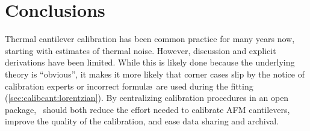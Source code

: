 \section{Conclusions}
\label{sec:calibcant:conclusions}

Thermal cantilever calibration has been common practice for many years
now\citep{hutter93,florin95}, starting with estimates of thermal
noise\citep{martin87}.  However, discussion and explicit derivations
have been limited.  While this is likely done because the underlying
theory is ``obvious'', it makes it more likely that corner cases slip
by the notice of calibration experts\citep{hutter93-erratum} or
incorrect formul\ae\ are used during the fitting
(\cref{sec:calibcant:lorentzian}).  By centralizing calibration
procedures in an open package, \calibcant\ should both reduce the
effort needed to calibrate AFM cantilevers, improve the quality of the
calibration, and ease data sharing and archival.
